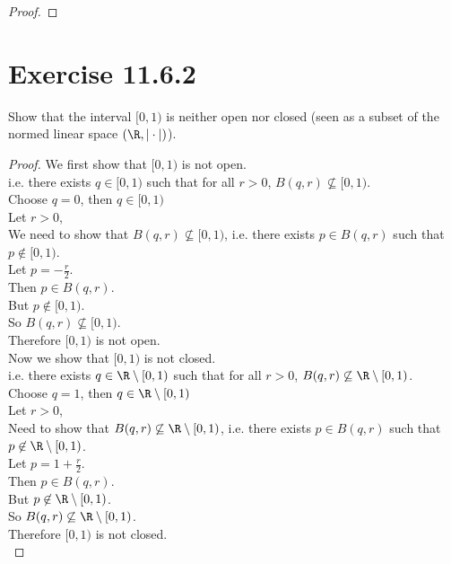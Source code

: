 \documentclass[problem]{classnotes}
\begin{document}
\begin{proof}
    \end{proof}

    \section{Exercise 11.6.2}
    \begin{problem}
        Show that the interval $[0,1)$ is neither open nor closed (seen as a subset of the normed linear space $(\R, |\cdot|)$).
    \end{problem}

    \begin{proof}
        We first show that $[0,1)$ is not open. \\
        i.e. there exists $q \in [0,1)$ such that for all $r > 0$, $B(q,r) \not\subseteq [0,1)$. \\
        Choose $q = 0$, then $q \in [0,1)$ \\
        Let $r > 0$, \\
        We need to show that $B(q,r) \not\subseteq [0,1)$, i.e. there exists $p \in B(q,r)$ such that $p \not\in [0,1)$. \\
        Let $p = -\frac{r}{2}$. \\
        Then $p \in B(q,r)$. \\
        But $p \not\in [0,1)$. \\
        So $B(q,r) \not\subseteq [0,1)$. \\
        Therefore $[0,1)$ is not open. \\

        Now we show that $[0,1)$ is not closed. \\
        i.e. there exists $q \in \R \setminus [0,1)$ such that for all $r > 0$, $B(q,r) \not\subseteq \R \setminus [0,1)$. \\
        Choose $q = 1$, then $q \in \R \setminus [0,1)$ \\
        Let $r > 0$, \\
        Need to show that $B(q,r) \not\subseteq \R \setminus [0,1)$, i.e. there exists $p \in B(q,r)$ such that $p \not\in \R \setminus [0,1)$. \\
        Let $p = 1 + \frac{r}{2}$. \\
        Then $p \in B(q,r)$. \\
        But $p \not\in \R \setminus [0,1)$. \\
        So $B(q,r) \not\subseteq \R \setminus [0,1)$. \\
        Therefore $[0,1)$ is not closed. \\
    \end{proof}
\end{document}
